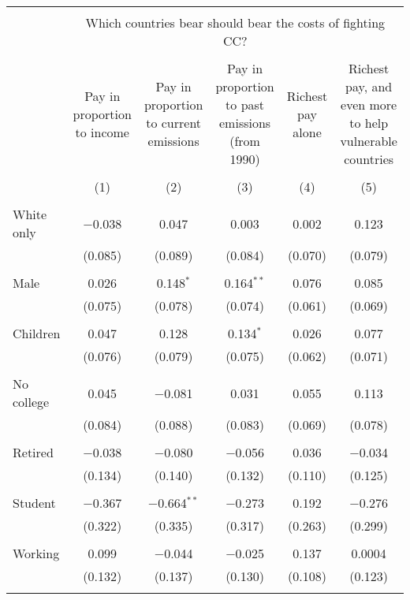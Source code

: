 
\begin{tabular}{@{\extracolsep{5pt}}lccccc} 
\\[-1.8ex]\hline 
\hline \\[-1.8ex] 
 & \multicolumn{5}{c}{Which countries bear should bear the costs of fighting CC?} \\ 
\cline{2-6} 
\\[-1.8ex] & Pay in proportion to income & Pay in proportion to current emissions & Pay in proportion to past emissions (from 1990) & Richest pay alone & Richest pay, and even more to help vulnerable countries \\ 
\\[-1.8ex] & (1) & (2) & (3) & (4) & (5)\\ 
\hline \\[-1.8ex] 
 White only & $-$0.038 & 0.047 & 0.003 & 0.002 & 0.123 \\ 
  & (0.085) & (0.089) & (0.084) & (0.070) & (0.079) \\ 
  & & & & & \\ 
 Male & 0.026 & 0.148$^{*}$ & 0.164$^{**}$ & 0.076 & 0.085 \\ 
  & (0.075) & (0.078) & (0.074) & (0.061) & (0.069) \\ 
  & & & & & \\ 
 Children & 0.047 & 0.128 & 0.134$^{*}$ & 0.026 & 0.077 \\ 
  & (0.076) & (0.079) & (0.075) & (0.062) & (0.071) \\ 
  & & & & & \\ 
 No college & 0.045 & $-$0.081 & 0.031 & 0.055 & 0.113 \\ 
  & (0.084) & (0.088) & (0.083) & (0.069) & (0.078) \\ 
  & & & & & \\ 
 Retired & $-$0.038 & $-$0.080 & $-$0.056 & 0.036 & $-$0.034 \\ 
  & (0.134) & (0.140) & (0.132) & (0.110) & (0.125) \\ 
  & & & & & \\ 
 Student & $-$0.367 & $-$0.664$^{**}$ & $-$0.273 & 0.192 & $-$0.276 \\ 
  & (0.322) & (0.335) & (0.317) & (0.263) & (0.299) \\ 
  & & & & & \\ 
 Working & 0.099 & $-$0.044 & $-$0.025 & 0.137 & 0.0004 \\ 
  & (0.132) & (0.137) & (0.130) & (0.108) & (0.123) \\ 
  & & & & & \\ 

\end{tabular}

